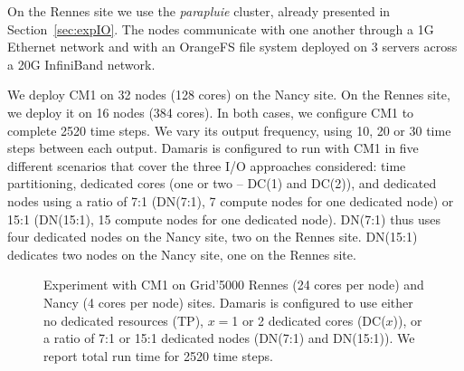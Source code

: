 On the Rennes site we use the \emph{parapluie} cluster, already presented in Section~\ref{sec:expIO}. 
The nodes communicate with one another through a 1G Ethernet network and with an OrangeFS file system
deployed on 3 servers across a 20G InfiniBand network.

We deploy CM1 on 32 nodes (128 cores) on the Nancy site. On the Rennes site, we deploy it on 16 nodes (384 cores).
In both cases, we configure CM1 to complete 2520 time steps. We vary its output frequency, using 10, 20 or 30 time steps
between each output. Damaris is configured to run with CM1 in five different scenarios that cover the three I/O approaches
considered: time partitioning, dedicated cores (one or two -- DC(1) and DC(2)), and dedicated
nodes using a ratio of 7:1 (DN(7:1), 7 compute nodes for one dedicated node) or 15:1 (DN(15:1), 15 compute nodes for one dedicated
node). DN(7:1) thus uses four dedicated nodes on the Nancy site, two on the Rennes site. DN(15:1) dedicates two nodes
on the Nancy site, one on the Rennes site.

\begin{figure}
	\begin{center}
	\quad
	\caption{Experiment with CM1 on Grid'5000 Rennes (24 cores per node) and Nancy (4 cores per node) sites. 
	Damaris is configured to use either no dedicated resources (TP), $x = $1 or 2 dedicated cores (DC($x$)),
	or a ratio of 7:1 or 15:1 dedicated nodes (DN(7:1) and DN(15:1)). We report total run time for 2520 time steps.}\label{fig:cm1dcdn}
	\end{center}
\end{figure}

